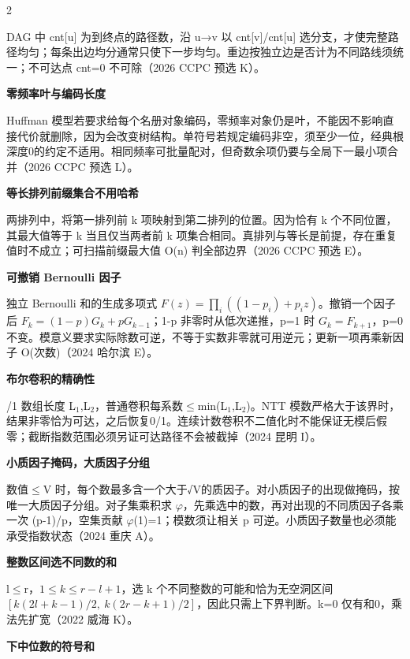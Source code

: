 \documentclass[UTF8,fontset=fandol,a4paper,twoside]{ctexart}
\newcommand{\note}[1]{{\fontsize{10}{12}\selectfont #1\par}}
\begin{document}
\begin{multicols}{2}
\note{DAG 中 cnt[\allowbreak{}u]\allowbreak{} 为到终点的路径数，沿 u→v 以 cnt[\allowbreak{}v]\allowbreak{}/\allowbreak{}cnt[\allowbreak{}u]\allowbreak{} 选分支，才使完整路径均匀；每条出边均分通常只使下一步均匀。重边按独立边是否计为不同路线须统一；不可达点 cnt=\allowbreak{}0 不可除（2026 CCPC 预选 K）。}
\par\textbf{零频率叶与编码长度}\quad
\note{Huffman 模型若要求给每个名册对象编码，零频率对象仍是叶，不能因不影响直接代价就删除，因为会改变树结构。单符号若规定编码非空，须至少一位，经典根深度0的约定不适用。相同频率可批量配对，但奇数余项仍要与全局下一最小项合并（2026 CCPC 预选 L）。}
\par\textbf{等长排列前缀集合不用哈希}\quad
\note{两排列中，将第一排列前 k 项映射到第二排列的位置。因为恰有 k 个不同位置，其最大值等于 k 当且仅当两者前 k 项集合相同。真排列与等长是前提，存在重复值时不成立；可扫描前缀最大值 O(\allowbreak{}n)\allowbreak{} 判全部边界（2026 CCPC 预选 E）。}
\par\textbf{可撤销 Bernoulli 因子}\quad
\note{独立 Bernoulli 和的生成多项式 $F(z)=\prod_i((1-p_i)+p_i z)$。撤销一个因子后 $F_k=(1-p)G_k+pG_{k-1}$；1-\allowbreak{}p 非零时从低次递推，p=\allowbreak{}1 时 $G_k=F_{k+1}$，p=\allowbreak{}0 不变。模意义要求实际除数可逆，不等于实数非零就可用逆元；更新一项再乘新因子 O(\allowbreak{}次数)\allowbreak{}（2024 哈尔滨 E）。}
\par\textbf{布尔卷积的精确性}\quad
\note{0/\allowbreak{}1 数组长度 L\ensuremath{_1},\allowbreak{}L\ensuremath{_2}，普通卷积每系数\ensuremath{\le}min(\allowbreak{}L\ensuremath{_1},\allowbreak{}L\ensuremath{_2})\allowbreak{}。NTT 模数严格大于该界时，结果非零恰为可达，之后恢复0/\allowbreak{}1。连续计数卷积不二值化时不能保证无模后假零；截断指数范围必须另证可达路径不会被截掉（2024 昆明 I）。}
\par\textbf{小质因子掩码，大质因子分组}\quad
\note{数值\ensuremath{\le}V 时，每个数最多含一个大于√V的质因子。对小质因子的出现做掩码，按唯一大质因子分组。对子集乘积求 \ensuremath{\varphi}，先乘选中的数，再对出现的不同质因子各乘一次 (\allowbreak{}p-\allowbreak{}1)\allowbreak{}/\allowbreak{}p，空集贡献 \ensuremath{\varphi}(\allowbreak{}1)\allowbreak{}=\allowbreak{}1；模数须让相关 p 可逆。小质因子数量也必须能承受指数状态（2024 重庆 A）。}
\par\textbf{整数区间选不同数的和}\quad
\note{l\ensuremath{\le}r，$1\le k\le r-l+1$，选 k 个不同整数的可能和恰为无空洞区间 $[k(2l+k-1)/2,\ k(2r-k+1)/2]$，因此只需上下界判断。k=\allowbreak{}0 仅有和0，乘法先扩宽（2022 威海 K）。}
\par\textbf{下中位数的符号和}\quad

\end{multicols}
\end{document}
